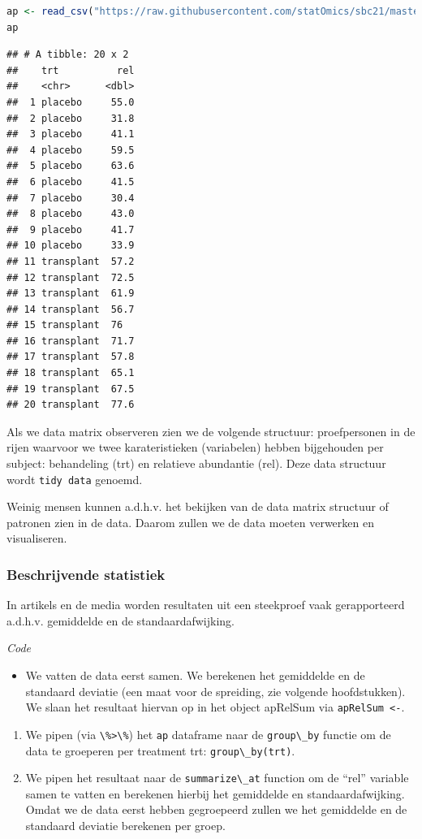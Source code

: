 \documentclass[
  12pt,dutch,coursenotes]{book}
\newcommand{\passthrough}[1]{#1}
\providecommand{\tightlist}{%
  \setlength{\itemsep}{0pt}\setlength{\parskip}{0pt}}
\begin{document}
\begin{lstlisting}[language=R]
ap <- read_csv("https://raw.githubusercontent.com/statOmics/sbc21/master/data/armpit.csv")
ap
\end{lstlisting}

\begin{lstlisting}
## # A tibble: 20 x 2
##    trt          rel
##    <chr>      <dbl>
##  1 placebo     55.0
##  2 placebo     31.8
##  3 placebo     41.1
##  4 placebo     59.5
##  5 placebo     63.6
##  6 placebo     41.5
##  7 placebo     30.4
##  8 placebo     43.0
##  9 placebo     41.7
## 10 placebo     33.9
## 11 transplant  57.2
## 12 transplant  72.5
## 13 transplant  61.9
## 14 transplant  56.7
## 15 transplant  76  
## 16 transplant  71.7
## 17 transplant  57.8
## 18 transplant  65.1
## 19 transplant  67.5
## 20 transplant  77.6
\end{lstlisting}

Als we data matrix observeren zien we de volgende structuur:
proefpersonen in de rijen waarvoor we twee karateristieken (variabelen) hebben bijgehouden per subject:
behandeling (trt) en relatieve abundantie (rel).
Deze data structuur wordt \passthrough{\lstinline!tidy data!} genoemd.

Weinig mensen kunnen a.d.h.v. het bekijken van de data matrix structuur of patronen zien in de data. Daarom zullen we de data moeten verwerken en visualiseren.

\hypertarget{beschrijvende-statistiek}{%
\subsubsection{Beschrijvende statistiek}\label{beschrijvende-statistiek}}

In artikels en de media worden resultaten uit een steekproef vaak gerapporteerd a.d.h.v. gemiddelde en de standaardafwijking.

\emph{Code}

\begin{itemize}
\tightlist
\item
  We vatten de data eerst samen. We berekenen het gemiddelde en de standaard deviatie (een maat voor de spreiding, zie volgende hoofdstukken).
  We slaan het resultaat hiervan op in het object apRelSum via \passthrough{\lstinline!apRelSum <-!}.
\end{itemize}

\begin{enumerate}
\def\labelenumi{\arabic{enumi}.}
\item
  We pipen (via \passthrough{\lstinline!\%>\%!}) het \passthrough{\lstinline!ap!} dataframe naar de \passthrough{\lstinline!group\_by!} functie om de data te groeperen per treatment trt: \passthrough{\lstinline!group\_by(trt)!}.
\item
  We pipen het resultaat naar de \passthrough{\lstinline!summarize\_at!} function om de ``rel'' variable samen te vatten en berekenen hierbij het gemiddelde en standaardafwijking. Omdat we de data eerst hebben gegroepeerd zullen we het gemiddelde en de standaard deviatie berekenen per groep.
\end{enumerate}
\end{document}

